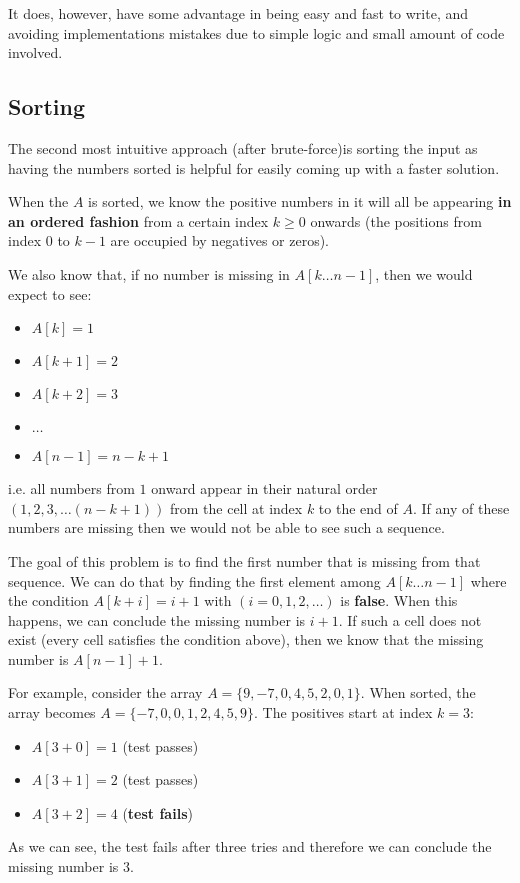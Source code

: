 It does, however, have some advantage in being  easy and fast to write, and avoiding implementations mistakes due to simple logic and small amount of code involved.


\subsection{Sorting}
\label{first_positive_missing:sec:sorting}

The second most intuitive approach (after brute-force)is sorting the input as having the numbers sorted is helpful for easily coming up with a faster solution.

When the $A$ is sorted, we know the positive numbers in it will all be appearing \textbf{in an ordered fashion} from a certain index $k\geq 0$ onwards (the positions from index $0$ to $k-1$ are occupied by negatives or zeros). 

We also know that, if no number is missing in $A[k \ldots n-1]$, then we would expect to see: 
\begin{itemize}
	\item $A[k]=1$
	\item $A[k+1]=2$
	\item $A[k+2]=3$
	\item $\ldots$
	\item $A[n-1]=n-k+1$
\end{itemize}

i.e. all numbers from $1$ onward appear in their natural order $(1,2,3, \ldots (n-k+1))$ from the cell at index $k$ to the end of $A$. 
If any of these numbers are missing then we would not be able to see such a sequence.

The goal of this problem is to find the first number that is missing from that sequence.  We can do that by finding the first element among $A[k \ldots n-1]$  where the condition $A[k+i]=i+1$ with $(i=0,1,2, \ldots)$ is \textbf{false}. When this happens, we can conclude the missing number is $i+1$.
If such a cell does not exist (every cell satisfies the condition above), then we know that the missing number is $A[n-1]+1$.

For example, consider the array $A=\{ 9,-7,0,4,5,2,0,1\}$. When sorted, the array
becomes $A=\{ -7,0,0,1,2,4,5,9\}$. The positives start at index $k=3$:
\begin{itemize}
	\item $A[3+0] = 1$ (test passes)
	\item $A[3+1] = 2$ (test passes)
	\item $A[3+2] = 4$ (\textbf{test fails})
\end{itemize}
As we can see, the test fails after three tries and therefore we can conclude the missing number is $3$.


